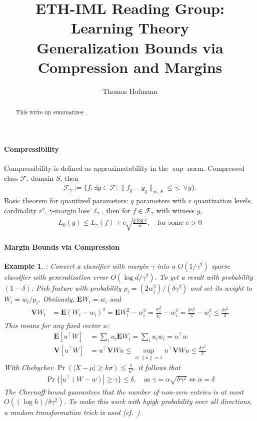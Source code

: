 \documentclass[12pt,a4paper]{article}
\author{Thomas Hofmann}
\title{{\large ETH-IML Reading Group: Learning Theory} \\ Generalization Bounds via Compression and Margins}
\newtheorem{example}{Example}
\newcommand{\E}{{\mathbf{E}}}
\begin{document}
\maketitle

\begin{abstract} 
This write-up summarizes \cite{arora2018stronger}.\\
\end{abstract}

\paragraph{Compressibility}  Compressibility is defined as approximatability in the $\sup$-norm. Compressed class $\mathcal F$, domain $S$, then 
\begin{align}
\mathcal F_\gamma := \{ f: \exists g \in \mathcal F: \| f_y - g_y \|_{\infty, S} \le \gamma, \; \forall y \}. 
\end{align}
Basic theorem for quantized parameters: $q$ parameters with $r$ quantization levels, cardinality $r^q$. $\gamma$-margin loss $\ell_\gamma$, then for $f \in \mathcal F_\gamma$ with witness $g$,
\begin{align}
L_0(g) \le L_\gamma(f) + c \sqrt{\frac{q \log r}{n}}, \quad \text{for some $c>0$}
\end{align}
%
%
%
\paragraph{Margin Bounds via Compression}
\begin{example}
\cite[Appendix A.2]{arora2018stronger}: Convert a classifier with margin $\gamma$ into a $O(1/\gamma^2)$ sparse classifier with generalization error $O(\log d/\gamma^2)$. To get a result with probability $(1-\delta)$: Pick feature with probability $p_i=(2w_i^2)/(\delta\gamma^2)$ and set its weight to $W_i = w_i /p_i$. Obviously, $\E W_i = w_i$ and 
\begin{align}
\mathbf V W_i 
& = \E (W_i - w_i)^2  = \E W_i^2 - w_i^2
= \frac{w_i^2}{p_i} - w_i^2 = \frac{\delta \gamma^2}{2} - w_i^2 \le \frac{\delta \gamma^2}{2} 
\end{align}
This means for any fixed vector $u$: 
\begin{align}
\E[u^\top W] &  = \sum_i u_i \E W_i  = \sum_i u_i w_i = u^\top w \\
\mathbf V[u^\top W] & = u^\top \mathbf V W u \le \sup_{u: \| u\|=1} u^\top \mathbf V W u  \le \frac{\delta \gamma^2}{2} 
\end{align}
With Chebychev $\Pr(|X-\mu |\geq k\sigma )\leq {\frac {1}{k^{2}}}.$ it follows that 
\begin{align}
\Pr\{ | u^\top (W-w) |  \geq \gamma\}  \leq \delta, \quad \text{as } \gamma = \alpha \sqrt{\delta \gamma^2} \iff \alpha =\delta
\end{align}
The Chernoff bound guarantees that the number of non-zero entries is at most $O((\log h)/\delta \gamma^2)$. To make this work with hgigh probability over all directions, a random transformation trick is used (cf.~\cite{blum2005random}). 
\end{example}
%
%
%
\end{document}
